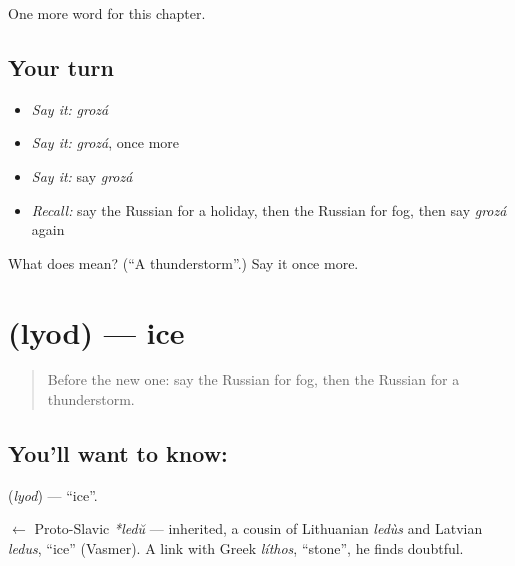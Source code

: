\begin{grammarlens}[title={What you've built}]
One more word for this chapter.
\end{grammarlens}

\subsection*{Your turn}
\begin{itemize}
\raggedright
  \item \emph{Say it:} \emph{grozá}
  \item \emph{Say it:} \emph{grozá}, once more
  \item \emph{Say it:} say \emph{grozá}
  \item \emph{Recall:} say the Russian for a holiday, then the Russian for fog, then say \emph{grozá} again
\end{itemize}

\begin{tcolorbox}[breakable,colback=teal!4,colframe=teal!35!black,title={Before you move on}]
What does  mean? (\textquotedblleft{}A thunderstorm\textquotedblright{}.) Say it once more.
\end{tcolorbox}
\section[\texorpdfstring{\ru{лёд} (lyod)}{лёд (lyod)}]{ (lyod) — ice}

\label{lesson:RU-C115-ice}



\begin{quote}
Before the new one: say the Russian for fog, then the Russian for a thunderstorm.
\end{quote}

\subsection*{You'll want to know: }
\textbf{} (\emph{lyod}) — \textquotedblleft{}ice\textquotedblright{}.

\begin{cousinweb}
\textbf{} $\leftarrow$ Proto-Slavic \emph{*ledŭ} — inherited, a cousin of Lithuanian \emph{ledùs} and Latvian \emph{ledus}, \textquotedblleft{}ice\textquotedblright{} (Vasmer). A link with Greek \emph{líthos}, \textquotedblleft{}stone\textquotedblright{}, he finds doubtful.
\end{cousinweb}

